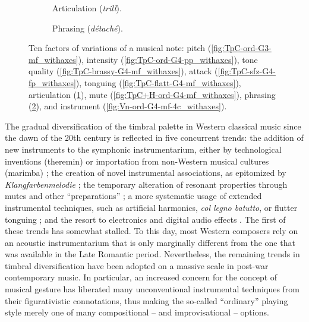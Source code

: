 \begin{figure}
        \vspace{3mm}

        \begin{subfigure}{0.25\textwidth}
                \centering
                \caption{Articulation (\emph{trill}).}
                \label{fig:TpC-trill-maj2-G4-mf_withaxes}
        \end{subfigure}%
        \begin{subfigure}{0.25\textwidth}
                \centering
                \caption{Phrasing (\emph{d\'{e}tach\'{e}}).}
                \label{fig:TpC+voc-harms-G4-mf_withaxes}
        \end{subfigure}%
        \caption{Ten factors of variations of a musical note: pitch (\ref{fig:TpC-ord-G3-mf_withaxes}), intensity (\ref{fig:TpC-ord-G4-pp_withaxes}), tone quality (\ref{fig:TpC-brassy-G4-mf_withaxes}), attack (\ref{fig:TpC-sfz-G4-fp_withaxes}), tonguing (\ref{fig:TpC-flatt-G4-mf_withaxes}), articulation (\ref{fig:TpC-trill-maj2-G4-mf_withaxes}), mute (\ref{fig:TpC+H-ord-G4-mf_withaxes}), phrasing (\ref{fig:TpC+voc-harms-G4-mf_withaxes}), and instrument (\ref{fig:Vn-ord-G4-mf-4c_withaxes}).}\label{fig:trumpet-variations}
\end{figure}

The gradual diversification of the timbral palette in Western classical music since the dawn of the 20th century is reflected in five concurrent trends:
the addition of new instruments to the symphonic instrumentarium, either by technological inventions (\eg theremin) or importation from non-Western musical cultures (\eg marimba) \cite[epilogue]{sachs2012book};
the creation of novel instrumental associations, as epitomized by \emph{Klangfarbenmelodie} \cite[chapter 22]{schoenberg2010book};
the temporary alteration of resonant properties through mutes and other ``preparations'' \cite{dianova2007phd};
a more systematic usage of extended instrumental techniques, such as artificial harmonics, \emph{col legno batutto}, or flutter tonguing \cite[chapter 11]{kostka2016book};
and the resort to electronics and digital audio effects \cite{zolzer2011dafx}.
The first of these trends has somewhat stalled.
To this day, most Western composers rely on an acoustic instrumentarium that is only marginally different from the one that was available in the Late Romantic period.
Nevertheless, the remaining trends in timbral diversification have been adopted on a massive scale in post-war contemporary music.
In particular, an increased concern for the concept of musical gesture \cite{godoy2009book} has liberated many unconventional instrumental techniques from their figurativistic connotations, thus making the so-called ``ordinary'' playing style merely one of many compositional -- and improvisational -- options.

